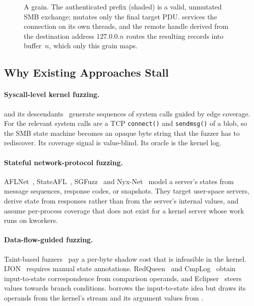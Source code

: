 \documentclass{article}
\begin{document}
\begin{figure}[t]
\caption{A grain. The authenticated prefix (shaded) is a valid, unmutated SMB
exchange; \libfuzzer mutates only the final target PDU. \ksmbd services the
connection on its own threads, and the remote handle derived from the
destination address $127.0.0.n$ routes the resulting \kcovdf records into
buffer~$n$, which only this grain maps.}\label{fig:grain}
\end{figure}

\subsection{Why Existing Approaches Stall}

\paragraph{Syscall-level kernel fuzzing.} \syzkaller and its
descendants~\cite{sun2021healer,wang2021syzvegas,pailoor2018moonshine}
generate sequences of system calls guided by edge coverage. For \ksmbd the
relevant system calls are a TCP \texttt{connect()} and \texttt{sendmsg()} of a
blob, so the SMB state machine becomes an opaque byte string that the fuzzer
has to rediscover. Its coverage signal is value-blind. Its oracle is the
kernel log.

\paragraph{Stateful network-protocol fuzzing.} AFLNet~\cite{pham2020aflnet},
StateAFL~\cite{natella2022stateafl}, SGFuzz~\cite{ba2022sgfuzz} and
Nyx-Net~\cite{schumilo2022nyxnet} model a server's states from message
sequences, response codes, or snapshots. They target user-space servers,
derive state from responses rather than from the server's internal values,
and assume per-process coverage that does not exist for a kernel server whose
work runs on kworkers.

\paragraph{Data-flow-guided fuzzing.} Taint-based fuzzers~\cite{chen2018angora,gan2020greyone}
pay a per-byte shadow cost that is infeasible in the kernel.
IJON~\cite{aschermann2020ijon} requires manual state annotations. RedQueen~\cite{aschermann2019redqueen}
and CmpLog~\cite{fioraldi2020aflpp} obtain input-to-state correspondence from
comparison operands, and Eclipser~\cite{choi2019eclipser} steers values
towards branch conditions. \toolname borrows the input-to-state idea but
draws its operands from the kernel's \tracecmp stream and its argument values
from \kcovdf.
\end{document}
